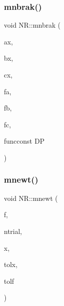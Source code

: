 \subsubsection{\texorpdfstring{mnbrak()}{mnbrak()}\hspace{0.1cm}{\footnotesize\ttfamily [2/2]}}
{\footnotesize\ttfamily void N\+R\+::mnbrak (\begin{DoxyParamCaption}\item[{\mbox{\hyperlink{namespaceNR_af6ff762dd605ff477b8e52387253a02a}{DP}} \&}]{ax,  }\item[{\mbox{\hyperlink{namespaceNR_af6ff762dd605ff477b8e52387253a02a}{DP}} \&}]{bx,  }\item[{\mbox{\hyperlink{namespaceNR_af6ff762dd605ff477b8e52387253a02a}{DP}} \&}]{cx,  }\item[{\mbox{\hyperlink{namespaceNR_af6ff762dd605ff477b8e52387253a02a}{DP}} \&}]{fa,  }\item[{\mbox{\hyperlink{namespaceNR_af6ff762dd605ff477b8e52387253a02a}{DP}} \&}]{fb,  }\item[{\mbox{\hyperlink{namespaceNR_af6ff762dd605ff477b8e52387253a02a}{DP}} \&}]{fc,  }\item[{\mbox{\hyperlink{namespaceNR_af6ff762dd605ff477b8e52387253a02a}{DP}} }]{funcconst DP }\end{DoxyParamCaption})}

\mbox{\label{namespaceNR_a9217e3777ed00b4cd6f83abd69e4cef9}} 
\subsubsection{\texorpdfstring{mnewt()}{mnewt()}}
{\footnotesize\ttfamily void N\+R\+::mnewt (\begin{DoxyParamCaption}\item[{const \mbox{\hyperlink{classNR_1_1ScalFuncMultiVars}{Scal\+Func\+Multi\+Vars}} \&}]{f,  }\item[{const int}]{ntrial,  }\item[{\mbox{\hyperlink{namespaceNR_ab293e06a6bf799d8a7ed932b6852bcb8}{Vec\+\_\+\+I\+O\+\_\+\+DP}} \&}]{x,  }\item[{const \mbox{\hyperlink{namespaceNR_af6ff762dd605ff477b8e52387253a02a}{DP}}}]{tolx,  }\item[{const \mbox{\hyperlink{namespaceNR_af6ff762dd605ff477b8e52387253a02a}{DP}}}]{tolf }\end{DoxyParamCaption})}

